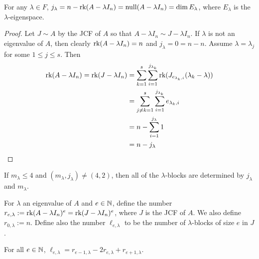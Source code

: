 \documentclass[11pt]{book}
\theoremstyle{definition}   \newtheorem{defn}[counter]{Definition} %
\newcommand{\vs}{\vspace{8pt}}   \newcommand{\hs}{\hspace{8pt}}
\numberwithin{counter}{chapter}
\begin{document}
\begin{lemma}
For any $\lambda \in F$, $j_\lambda = n - \textnormal{rk}(A - \lambda I_n) = \textnormal{null}(A - \lambda I_n) = \dim E_\lambda$, where $E_\lambda$ is the $\lambda$-eigenspace. 
\end{lemma}

\begin{proof}
Let $J \sim A$ by the JCF of $A$ so that $A - \lambda I_n \sim J - \lambda I_n$. If $\lambda$ is not an eigenvalue of $A$, then clearly $\textnormal{rk}(A - \lambda I_n) = n$ and $j_\lambda = 0 = n - n$. Assume $\lambda = \lambda_j$ for some $1 \leq j \leq s$. Then
\begin{align*}
\textnormal{rk}(A - \lambda I_n) = \textnormal{rk}(J - \lambda I_n) &= \sum_{k=1}^s \sum_{i=1}^{j_{\lambda_k}} \textnormal{rk}(J_{e_{\lambda_k,i}}(\lambda_k-\lambda)) \\
&= \sum_{j \ne k = 1}^{s} \sum_{i=1}^{j_{\lambda_k}} e_{\lambda_k,i} \\
&= n - \sum_{i=1}^{j_\lambda} 1 \\
&= n - j_\lambda
\end{align*}
\end{proof}

\vs

\begin{remark}
If $m_\lambda \leq 4$ and $(m_\lambda,j_\lambda) \ne (4,2)$, then all of the $\lambda$-blocks are determined by $j_\lambda$ and $m_\lambda$. 
\end{remark}

\vs

For $\lambda$ an eigenvalue of $A$ and $e \in \operatorname{\mathbb{N}}$, define the number $r_{e,\lambda} := \textnormal{rk}(A-\lambda I_n)^e = \textnormal{rk}(J-\lambda I_n)^e$, where $J$ is the JCF of $A$. We also define $r_{0,\lambda} := n$. Define also the number $\ell_{e,\lambda}$ to be the number of $\lambda$-blocks of size $e$ in $J$. 

\vs

\begin{lemma}
For all $e \in \operatorname{\mathbb{N}}$, $\ell_{e,\lambda} = r_{e-1,\lambda} - 2 r_{e,\lambda} + r_{e+1,\lambda}$. 
\end{lemma}
\end{document}

